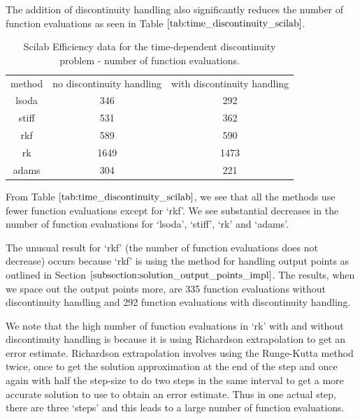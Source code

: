 The addition of discontinuity handling also significantly reduces the number of function evaluations as seen in Table $\ref{tab:time_discontinuity_scilab}$.

\begin{table}[H]
\caption {Scilab Efficiency data for the time-dependent discontinuity problem - number of function evaluations.} 
\label{tab:time_discontinuity_scilab} 
\begin{center}
\begin{tabular}{ c c c }
method & no discontinuity handling & with discontinuity handling \\ 
lsoda & 346 & 292 \\
stiff & 531 & 362 \\
rkf & 589 & 590 \\
rk & 1649 & 1473 \\
adams & 304 & 221 \\
\end{tabular}
\end{center}
\end{table}

From Table $\ref{tab:time_discontinuity_scilab}$, we see that all the methods use fewer function evaluations except for `rkf'. We see substantial decreases in the number of function evaluations for `lsoda', `stiff', `rk' and `adams'.

The unusual result for `rkf' (the number of function evaluations does not decrease) occurs because `rkf' is using the method for handling output points as outlined in Section $\ref{subsection:solution_output_points_impl}$. The results, when we space out the output points more, are 335 function evaluations without discontinuity handling and 292 function evaluations with discontinuity handling.

We note that the high number of function evaluations in `rk' with and without discontinuity handling is because it is using Richardson extrapolation \cite{MR1261869} to get an error estimate. Richardson extrapolation involves using the Runge-Kutta method twice, once to get the solution approximation at the end of the step and once again with half the step-size to do two steps in the same interval to get a more accurate solution to use to obtain an error estimate. Thus in one actual step, there are three `steps' and this leads to a large number of function evaluations.

